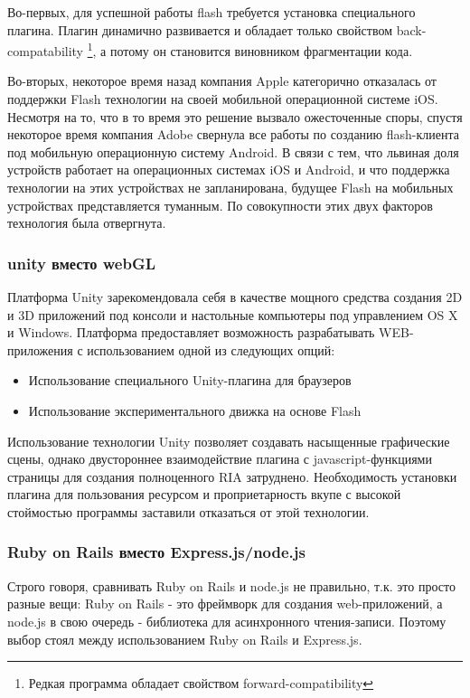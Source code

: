 \documentclass[12pt, a4paper]{article}
\begin{document}
Во-первых, для успешной работы flash требуется установка специального плагина. Плагин
динамично развивается и обладает только свойством back-compatability
\footnote{Редкая программа обладает свойством forward-compatibility}, а потому он
становится виновником фрагментации кода.

Во-вторых, некоторое время назад компания Apple категорично отказалась от
поддержки Flash технологии на своей мобильной операционной системе iOS. Несмотря
на то, что в то время это решение вызвало ожесточенные споры, спустя некоторое
время компания Adobe свернула все работы по созданию flash-клиента под мобильную
операционную систему Android. В связи с тем, что львиная доля устройств работает
на операционных системах iOS и Android, и что поддержка технологии на этих
устройствах не запланирована, будущее Flash на мобильных устройствах
представляется туманным. По совокупности этих двух факторов технология была
отвергнута.

\subsubsection{unity вместо webGL}
Платформа Unity зарекомендовала себя в качестве мощного средства создания 2D и
3D приложений под консоли и настольные компьютеры под управлением OS X и
Windows. Платформа предоставляет возможность разрабатывать WEB-приложения с
использованием одной из следующих опций:
\begin{itemize}
    \item Использование специального Unity-плагина для браузеров
    \item Использование экспериментального движка на основе Flash
\end{itemize}
Использование технологии Unity позволяет создавать насыщенные графические сцены,
однако двустороннее взаимодействие плагина с javascript-функциями страницы для
создания полноценного RIA затруднено. Необходимость установки плагина для
пользования ресурсом и проприетарность вкупе с высокой стоймостью программы
заставили отказаться от этой технологии.

\subsubsection{Ruby on Rails вместо Express.js/node.js}
Строго говоря, сравнивать Ruby on Rails и node.js не правильно, т.к. это просто
разные вещи: Ruby on Rails - это фреймворк для создания web-приложений, а
node.js в свою очередь - библиотека для асинхронного чтения-записи. Поэтому
выбор стоял между использованием Ruby on Rails и Express.js.
\end{document}

